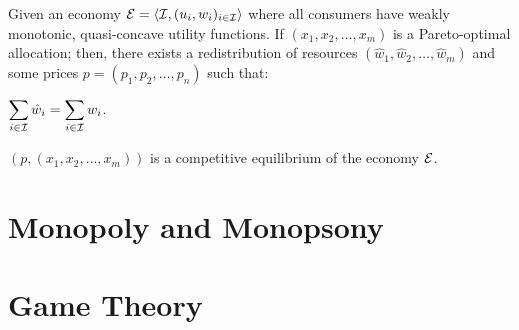 \documentclass[8pt,a4paper]{extarticle}
\begin{document}
\begin{multicols}{3}
  \begin{boxtheo}[Welfare II]
    Given an economy $\displaystyle \mathcal{E} = \left\langle \mathcal{I}, (u_i, w_i)_{i \in \mathcal{I}} \right\rangle$ where all consumers have weakly monotonic, quasi-concave utility functions. If $(x_1, x_2, \ldots, x_m)$ is a Pareto-optimal allocation; then, there exists a redistribution of resources $(\hat{w}_1, \hat{w}_2, \ldots, \hat{w}_m)$ and some prices $p = (p_1, p_2, \ldots, p_n)$ such that:
    \begin{eqlist}
      \item $\displaystyle \sum_{i \in \mathcal{I}} \hat{w}_i = \sum_{i \in \mathcal{I}} w_i$.
      \item $(p, (x_1, x_2, \ldots, x_m))$ is a competitive equilibrium of the economy $\mathcal{E}$.
    \end{eqlist}
  \end{boxtheo}

  \newpage

  \section{Monopoly and Monopsony}

  \newpage

  \section{Game Theory}

  \vfill\eject
  \columnbreak
\end{multicols}
\end{document}
